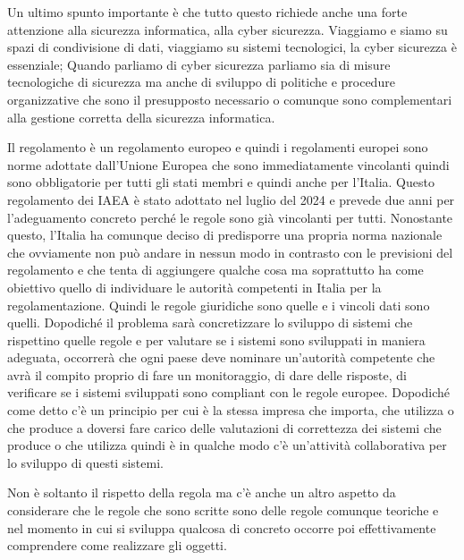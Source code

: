 Un ultimo spunto importante è che tutto questo richiede anche una forte attenzione alla sicurezza informatica, alla cyber sicurezza.
Viaggiamo e siamo su spazi di condivisione di dati, viaggiamo su sistemi tecnologici, la cyber sicurezza è essenziale; Quando parliamo di cyber sicurezza parliamo sia di misure tecnologiche di sicurezza ma anche di sviluppo di politiche e procedure organizzative che sono il presupposto necessario o comunque sono complementari alla gestione corretta della sicurezza informatica.

Il regolamento è un regolamento europeo e quindi i regolamenti europei sono norme adottate dall'Unione Europea che sono immediatamente vincolanti quindi sono obbligatorie per tutti gli stati membri e quindi anche per l'Italia.
Questo regolamento dei IAEA è stato adottato nel luglio del 2024 e prevede due anni per l'adeguamento concreto perché le regole sono già vincolanti per tutti.
Nonostante questo, l'Italia ha comunque deciso di predisporre una propria norma nazionale che ovviamente non può andare in nessun modo in contrasto con le previsioni del regolamento e che tenta di aggiungere qualche cosa ma soprattutto ha come obiettivo quello di individuare le autorità competenti in Italia per la regolamentazione.
Quindi le regole giuridiche sono quelle e i vincoli dati sono quelli.
Dopodiché il problema sarà concretizzare lo sviluppo di sistemi che rispettino quelle regole e per valutare se i sistemi sono sviluppati in maniera adeguata, occorrerà che ogni paese deve nominare un'autorità competente che avrà il compito proprio di fare un monitoraggio, di dare delle risposte, di verificare se i sistemi sviluppati sono compliant con le regole europee.
Dopodiché come detto c'è un principio per cui è la stessa impresa che importa, che utilizza o che produce a doversi fare carico delle valutazioni di correttezza dei sistemi che produce o che utilizza quindi è in qualche modo c'è un'attività collaborativa per lo sviluppo di questi sistemi.


Non è soltanto il rispetto della regola ma c'è anche un altro aspetto da considerare che le regole che sono scritte sono delle regole comunque teoriche e nel momento in cui si sviluppa qualcosa di concreto occorre poi effettivamente comprendere come realizzare gli oggetti.


